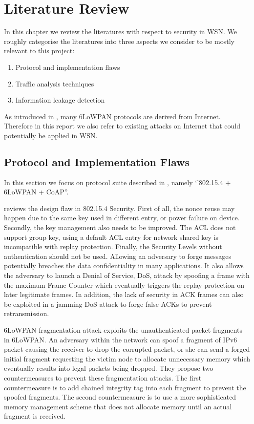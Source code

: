 \chapter{Literature Review} \label{Chp: LiteratureReview}

In this chapter we review the literatures with respect to security in WSN. We roughly categorise the literatures into three aspects we consider to be mostly relevant to this project:

\begin{enumerate}
	\item Protocol and implementation flaws
	\item Traffic analysis techniques
	\item Information leakage detection
\end{enumerate}

As introduced in , many 6LoWPAN protocols are derived from Internet. Therefore in this report we also refer to existing attacks on Internet that could potentially be applied in WSN.

\section{Protocol and Implementation Flaws}

In this section we focus on protocol suite described in , namely `'802.15.4 + 6LoWPAN + CoAP''.

\cite{802154sec} reviews the design flaw in 802.15.4 Security. First of all, the nonce reuse may happen due to the same key used in different entry, or power failure on device. Secondly, the key management also needs to be improved. The ACL does not support group key, using a default ACL entry for network shared key is incompatible with replay protection. Finally, the Security Levels without authentication should not be used. Allowing an adversary to forge messages potentially breaches the data confidentiality in many applications. It also allows the adversary to launch a Denial of Service, DoS, attack by spoofing a frame with the maximum Frame Counter which eventually triggers the replay protection on later legitimate frames. In addition, the lack of security in ACK frames can also be exploited in a jamming DoS attack to forge false ACKs to prevent retransmission.

6LoWPAN fragmentation attack\cite{6lpFragAtk} exploits the unauthenticated packet fragments in 6LoWPAN. An adversary within the network can spoof a fragment of IPv6 packet causing the receiver to drop the corrupted  packet, or she can send a forged initial fragment requesting the victim node to allocate unnecessary memory which eventually results into legal packets being dropped. They propose two countermeasures to prevent these fragmentation attacks. The first countermeasure is to add chained integrity tag into each fragment to prevent the spoofed fragments. The second countermeasure is to use a more sophisticated memory management scheme that does not allocate memory until an actual fragment is received.

